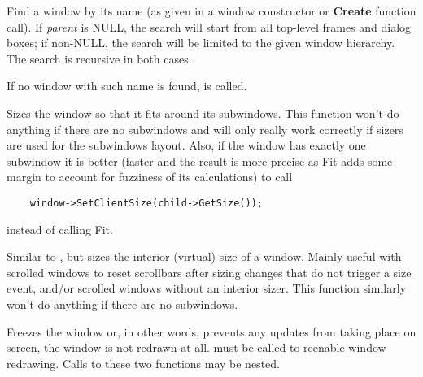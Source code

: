 


\label{wxwindowfindwindowbyname}


Find a window by its name (as given in a window constructor or {\bf Create} function call).
If {\it parent} is NULL, the search will start from all top-level
frames and dialog boxes; if non-NULL, the search will be limited to the given window hierarchy.
The search is recursive in both cases.

If no window with such name is found,
 is called.




\label{wxwindowfit}


Sizes the window so that it fits around its subwindows. This function won't do
anything if there are no subwindows and will only really work correctly if
sizers are used for the subwindows layout. Also, if the window has exactly one
subwindow it is better (faster and the result is more precise as Fit adds some
margin to account for fuzziness of its calculations) to call

\begin{verbatim}
    window->SetClientSize(child->GetSize());
\end{verbatim}

instead of calling Fit.


\label{wxwindowfitinside}


Similar to , but sizes the interior (virtual) size
of a window.  Mainly useful with scrolled windows to reset scrollbars after
sizing changes that do not trigger a size event, and/or scrolled windows without
an interior sizer.  This function similarly won't do anything if there are no
subwindows.


\label{wxwindowfreeze}


Freezes the window or, in other words, prevents any updates from taking place
on screen, the window is not redrawn at all.  must
be called to reenable window redrawing. Calls to these two functions may be
nested.

